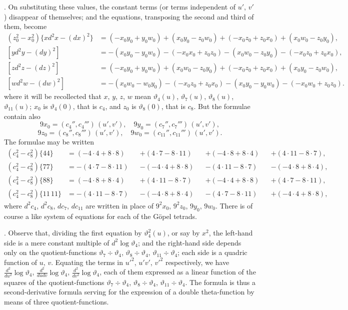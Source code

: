 \documentclass[12pt]{article}
\theoremstyle{plain}
\begin{document}
. On substituting these values, the constant terms (or terms independent of $u'$, $v'$) disappear of themselves; and the equations, transposing the second and third of them, become
\[
\begin{aligned}
(z_0^2 - x_0^2)\{xd^2x - (dx)^2\} &= (-x_0 y_0 + y_0 w_0) + (x_0 y_0 - z_0 w_0) + (-x_0 z_0 + z_0 x_0) + (x_0 w_0 - z_0 y_0),\\
[yd^2y - (dy)^2] &= -(x_0 y_0 - y_0 w_0) - (-x_0 x_0 + z_0 z_0) - (x_0 w_0 - z_0 y_0) - (-x_0 z_0 + z_0 x_0),\\
[zd^2z - (dz)^2] &= (-x_0 y_0 + y_0 w_0) + (x_0 w_0 - z_0 y_0) + (-x_0 z_0 + z_0 x_0) + (x_0 y_0 - z_0 w_0),\\
[wd^2w - (dw)^2] &= -(x_0 w_0 - w_0 y_0) - (-x_0 z_0 + z_0 x_0) - (x_0 y_0 - y_0 w_0) - (-x_0 w_0 + z_0 z_0).
\end{aligned}
\]
where it will be recollected that $x$, $y$, $z$, $w$ mean $\vartheta_4(u)$, $\vartheta_7(u)$, $\vartheta_8(u)$, $\vartheta_{11}(u)$; $x_0$ is $\vartheta_4(0)$, that is $c_4$, and $z_0$ is $\vartheta_8(0)$, that is $c_8$. But the formulae contain also
\[
9x_0 = (c_4'', c_4''') \, (u', v'),\quad 9y_0 = (c_7'', c_7''') \, (u', v'),
\]
\[
9z_0 = (c_8'', c_8''') \, (u', v'),\quad 9w_0 = (c_{11}'', c_{11}''') \, (u', v').
\]
The formulae may be written
\[
\begin{aligned}
(c_4^2 - c_8^2)\{44\} &= (-4 \cdot 4 + 8 \cdot 8) &&+ (4 \cdot 7 - 8 \cdot 11) &&+ (-4 \cdot 8 + 8 \cdot 4) &&+ (4 \cdot 11 - 8 \cdot 7),\\
(c_4^2 - c_8^2)\{77\} &= -(4 \cdot 7 - 8 \cdot 11) &&- (-4 \cdot 4 + 8 \cdot 8) &&- (4 \cdot 11 - 8 \cdot 7) &&- (-4 \cdot 8 + 8 \cdot 4),\\
(c_4^2 - c_8^2)\{88\} &= (-4 \cdot 8 + 8 \cdot 4) &&+ (4 \cdot 11 - 8 \cdot 7) &&+ (-4 \cdot 4 + 8 \cdot 8) &&+ (4 \cdot 7 - 8 \cdot 11),\\
(c_4^2 - c_8^2)\{11\,11\} &= -(4 \cdot 11 - 8 \cdot 7) &&- (-4 \cdot 8 + 8 \cdot 4) &&- (4 \cdot 7 - 8 \cdot 11) &&+ (-4 \cdot 4 + 8 \cdot 8),
\end{aligned}
\]
where $d^2c_4$, $d^2c_8$, $dc_7$, $dc_{11}$ are written in place of $9^2x_0$, $9^2z_0$, $9y_0$, $9w_0$. There is of course a like system of equations for each of the G\"opel tetrads.

\newpage
\setcounter{page}{560}

. Observe that, dividing the first equation by $\vartheta_4^2(u)$, or say by $x^2$, the left-hand side is a mere constant multiple of $d^2 \log \vartheta_4$; and the right-hand side depends only on the quotient-functions $\vartheta_7 \div \vartheta_4$, $\vartheta_8 \div \vartheta_4$, $\vartheta_{11} \div \vartheta_4$; each side is a quadric function of $u$, $v$. Equating the terms in $u'^2$, $u'v'$, $v'^2$ respectively, we have $\frac{d^2}{du^2} \log \vartheta_4$, $\frac{d^2}{dudv} \log \vartheta_4$, $\frac{d^2}{dv^2} \log \vartheta_4$, each of them expressed as a linear function of the squares of the quotient-functions $\vartheta_7 \div \vartheta_4$, $\vartheta_8 \div \vartheta_4$, $\vartheta_{11} \div \vartheta_4$. The formula is thus a second-derivative formula serving for the expression of a double theta-function by means of three quotient-functions.
\end{document}

